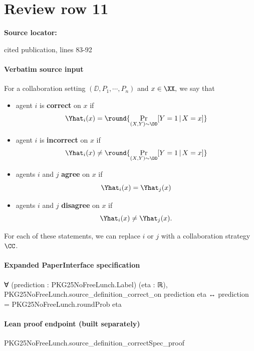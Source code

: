 \documentclass[10pt]{article}
\begin{document}
\section*{Review row 11}
\textbf{Source locator:} {\footnotesize\raggedright cited publication, lines 83-\allowbreak{}92\par}
\paragraph{Verbatim source input}
\begin{ReviewVerbatim}
\begin{definition}\label{def:correct}
For a collaboration setting $(\DD, P_1,\cdots,P_n)$ and $x\in \XX,$ we say that
\begin{itemize}
    \item agent $i$ is \textbf{correct} on $x$ if $$\Yhat_i(x) = \round{\Pr_{(X,Y)\sim \DD}[Y=1\,|\,X=x]}$$
    \item agent $i$ is \textbf{incorrect} on $x$ if $$\Yhat_i(x) \neq \round{\Pr_{(X,Y)\sim \DD}[Y=1\,|\,X=x]}$$
    \item agents $i$ and $j$ \textbf{agree} on $x$ if $$\Yhat_i(x) = \Yhat_j(x)$$
    \item agents $i$ and $j$ \textbf{disagree} on $x$ if $$\Yhat_i(x) \neq \Yhat_j(x).$$
\end{itemize}
For each of these statements, we can replace $i$ or $j$ with a collaboration strategy $\CC$.
\end{definition}
\end{ReviewVerbatim}


\paragraph{Expanded PaperInterface specification}
\begin{ReviewVerbatim}
∀ (prediction : PKG25NoFreeLunch.Label) (eta : ℝ),
  PKG25NoFreeLunch.source_definition_correct_on prediction eta ↔ prediction = PKG25NoFreeLunch.roundProb eta
\end{ReviewVerbatim}

\paragraph{Lean proof endpoint (built separately)}\begin{ReviewVerbatim}
PKG25NoFreeLunch.source_definition_correctSpec_proof
\end{ReviewVerbatim}
\end{document}
